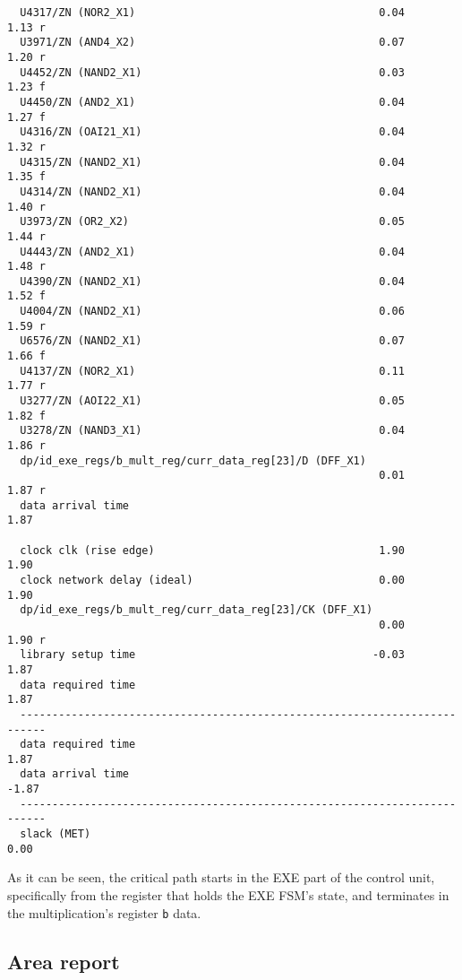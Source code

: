 \begin{verbatim}
  U4317/ZN (NOR2_X1)                                      0.04       1.13 r
  U3971/ZN (AND4_X2)                                      0.07       1.20 r
  U4452/ZN (NAND2_X1)                                     0.03       1.23 f
  U4450/ZN (AND2_X1)                                      0.04       1.27 f
  U4316/ZN (OAI21_X1)                                     0.04       1.32 r
  U4315/ZN (NAND2_X1)                                     0.04       1.35 f
  U4314/ZN (NAND2_X1)                                     0.04       1.40 r
  U3973/ZN (OR2_X2)                                       0.05       1.44 r
  U4443/ZN (AND2_X1)                                      0.04       1.48 r
  U4390/ZN (NAND2_X1)                                     0.04       1.52 f
  U4004/ZN (NAND2_X1)                                     0.06       1.59 r
  U6576/ZN (NAND2_X1)                                     0.07       1.66 f
  U4137/ZN (NOR2_X1)                                      0.11       1.77 r
  U3277/ZN (AOI22_X1)                                     0.05       1.82 f
  U3278/ZN (NAND3_X1)                                     0.04       1.86 r
  dp/id_exe_regs/b_mult_reg/curr_data_reg[23]/D (DFF_X1)
                                                          0.01       1.87 r
  data arrival time                                                  1.87

  clock clk (rise edge)                                   1.90       1.90
  clock network delay (ideal)                             0.00       1.90
  dp/id_exe_regs/b_mult_reg/curr_data_reg[23]/CK (DFF_X1)
                                                          0.00       1.90 r
  library setup time                                     -0.03       1.87
  data required time                                                 1.87
  --------------------------------------------------------------------------
  data required time                                                 1.87
  data arrival time                                                 -1.87
  --------------------------------------------------------------------------
  slack (MET)                                                        0.00
\end{verbatim}

As it can be seen, the critical path starts in the EXE part of the control unit, specifically from the register that holds the EXE FSM's state,
and terminates in the multiplication's register \verb|b| data.

\subsection{Area report}

